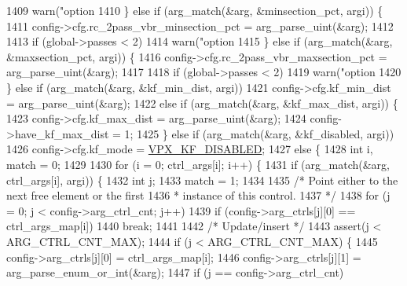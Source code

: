 \begin{DoxyCodeInclude}
{{{{{{{{{{{{{{{{{{{{{{{{{{{{{{{{{{1409         warn(\textcolor{stringliteral}{"option %
1410     \} \textcolor{keywordflow}{else} \textcolor{keywordflow}{if} (arg\_match(&arg, &minsection\_pct, argi)) \{
1411       config->cfg.rc\_2pass\_vbr\_minsection\_pct = arg\_parse\_uint(&arg);
1412 
1413       \textcolor{keywordflow}{if} (global->passes < 2)
1414         warn(\textcolor{stringliteral}{"option %
1415     \} \textcolor{keywordflow}{else} \textcolor{keywordflow}{if} (arg\_match(&arg, &maxsection\_pct, argi)) \{
1416       config->cfg.rc\_2pass\_vbr\_maxsection\_pct = arg\_parse\_uint(&arg);
1417 
1418       \textcolor{keywordflow}{if} (global->passes < 2)
1419         warn(\textcolor{stringliteral}{"option %
1420     \} \textcolor{keywordflow}{else} \textcolor{keywordflow}{if} (arg\_match(&arg, &kf\_min\_dist, argi))
1421       config->cfg.kf\_min\_dist = arg\_parse\_uint(&arg);
1422     \textcolor{keywordflow}{else} \textcolor{keywordflow}{if} (arg\_match(&arg, &kf\_max\_dist, argi)) \{
1423       config->cfg.kf\_max\_dist = arg\_parse\_uint(&arg);
1424       config->have\_kf\_max\_dist = 1;
1425     \} \textcolor{keywordflow}{else} \textcolor{keywordflow}{if} (arg\_match(&arg, &kf\_disabled, argi))
1426       config->cfg.kf\_mode = \hyperlink{group__encoder_gga9f461802aa4db35c04a8b23837987f40a56513f60cbf3434ca0092173005d0ab2}{VPX\_KF\_DISABLED};
1427     \textcolor{keywordflow}{else} \{
1428       \textcolor{keywordtype}{int} i, match = 0;
1429 
1430       \textcolor{keywordflow}{for} (i = 0; ctrl\_args[i]; i++) \{
1431         \textcolor{keywordflow}{if} (arg\_match(&arg, ctrl\_args[i], argi)) \{
1432           \textcolor{keywordtype}{int} j;
1433           match = 1;
1434 
1435           \textcolor{comment}{/* Point either to the next free element or the first}
1436 \textcolor{comment}{          * instance of this control.}
1437 \textcolor{comment}{          */}
1438           \textcolor{keywordflow}{for} (j = 0; j < config->arg\_ctrl\_cnt; j++)
1439             \textcolor{keywordflow}{if} (config->arg\_ctrls[j][0] == ctrl\_args\_map[i])
1440               \textcolor{keywordflow}{break};
1441 
1442           \textcolor{comment}{/* Update/insert */}
1443           assert(j < ARG\_CTRL\_CNT\_MAX);
1444           \textcolor{keywordflow}{if} (j < ARG\_CTRL\_CNT\_MAX) \{
1445             config->arg\_ctrls[j][0] = ctrl\_args\_map[i];
1446             config->arg\_ctrls[j][1] = arg\_parse\_enum\_or\_int(&arg);
1447             \textcolor{keywordflow}{if} (j == config->arg\_ctrl\_cnt)
}}}}}}}}}}}}}}}}}}}}}}}}}}}}}}}}}}}}}
\end{DoxyCodeInclude}
